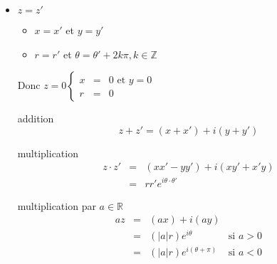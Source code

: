 \begin{itemize}
	\item $z = z'$
		\begin{itemize}
			\item $x = x'$ et $y=y'$
			\item $r=r'$ et $\theta = \theta' + 2k\pi, k \in \mathbb{Z}$
		\end{itemize}
	Donc $z=0 \left\{ \begin{array}{rcl}
					x &=& 0 \text{ et } y = 0\\
					r &=& 0\end{array}\right.$
	
	\item[addition] \[z+z' = (x+x') + i(y+y')\]
	\item[multiplication] \[\begin{array}{rcl}
		z\cdot z' &=& (xx' - yy') + i(xy'+x'y) \\
&=& rr'e^{i\theta \cdot \theta'}\end{array}\]

	\item[multiplication par $a \in \mathbb{R}$]
		\[\begin{array}{rclr}
			az &=& (ax) + i(ay) \\
&=& (|a|r)e^{i\theta} & \text{si } a > 0 \\
&=& (|a|r)e^{i(\theta + \pi)} & \text{si } a < 0 \end{array}\]

\end{itemize}
